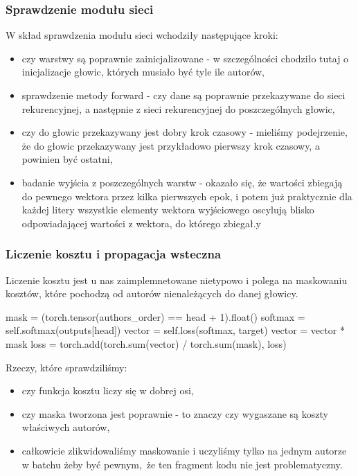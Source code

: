 \subsubsection{Sprawdzenie modułu sieci}
W skład sprawdzenia modułu sieci wchodziły następujące kroki:
	\begin{itemize} 
	  \item {czy warstwy są poprawnie zainicjalizowane - w szczególności chodziło tutaj o inicjalizacje głowic, 
	  których musiało być tyle ile autorów,}
	  \item {sprawdzenie metody forward - czy dane są poprawnie przekazywane do sieci rekurencyjnej, a następnie 
	  z sieci rekurencyjnej do poszczególnych głowic,}
	  \item {czy do głowic przekazywany jest dobry krok czasowy - mieliśmy podejrzenie, że do głowic przekazywany jest przykładowo
	  pierwszy krok czasowy, a powinien być ostatni,}
	  \item {badanie wyjścia z poszczególnych warstw - okazało się, że wartości zbiegają do pewnego wektora przez kilka pierwszych epok,
	  i potem już praktycznie dla każdej litery wszystkie elementy wektora wyjściowego oscylują blisko odpowiadającej wartości z  wektora,
	  do którego zbiegał.y}
	\end{itemize}

\subsubsection{Liczenie kosztu i propagacja wsteczna}
Liczenie kosztu jest u nas zaimplemnetowane nietypowo i polega na maskowaniu kosztów, które pochodzą od autorów
nienależących do danej głowicy. 
\begin{python}
mask = (torch.tensor(authors_order) == head + 1).float()
softmax = self.softmax(outputs[head])
vector = self.loss(softmax, target)
vector = vector * mask
loss = torch.add(torch.sum(vector) / torch.sum(mask), loss)
    
\end{python} 
Rzeczy, które sprawdziliśmy: 
\begin{itemize}
	  \item {czy funkcja kosztu liczy się w dobrej osi,}
	  \item {czy maska tworzona jest poprawnie - to znaczy czy wygaszane są koszty właściwych autorów,}
	  \item {całkowicie zlikwidowaliśmy maskowanie i uczyliśmy tylko na jednym autorze w batchu żeby być pewnym, że ten fragment
	  kodu nie jest problematyczny.}
\end{itemize}

